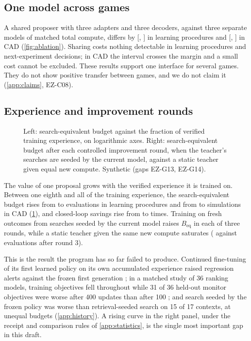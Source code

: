 \subsection{One model across games}

A shared proposer with three adapters and three decoders, against three separate models of matched
total compute, differs by \syn[EZ-G11]{\EZtrA} [\syn[EZ-G11]{\EZtrAlo}, \syn[EZ-G11]{\EZtrAhi}] in
learning procedures and \syn[EZ-G11]{\EZtrC} [\syn[EZ-G11]{\EZtrClo}, \syn[EZ-G11]{\EZtrChi}] in CAD
(\cref{fig:ablation}). Sharing costs nothing detectable in learning procedures and next-experiment
decisions; in CAD the interval crosses the margin and a small cost cannot be excluded. These results
support one interface for several games. They do not show positive transfer between games, and we do
not claim it (\cref{app:claims}, EZ-C08).

\subsection{Experience and improvement rounds}

\begin{figure}[t]
\centering

\caption{Left: search-equivalent budget against the fraction of verified training experience, on
logarithmic axes. Right: search-equivalent budget after each controlled improvement round, when the
teacher's searches are seeded by the current model, against a static teacher given equal new compute.
Synthetic (gaps EZ-G13, EZ-G14).}
\label{fig:scaling}
\end{figure}

The value of one proposal grows with the verified experience it is trained on. Between one eighth
and all of the training experience, the search-equivalent budget rises from
\syn[EZ-G13]{\EZhistAlow} to \syn[EZ-G13]{\EZbeqA} evaluations in learning procedures and from \syn[EZ-G13]{\EZhistClow} to
\syn[EZ-G13]{\EZbeqC} simulations in CAD (\cref{fig:scaling}), and closed-loop savings rise from
\syn[EZ-G13]{\EZhistSaveLow} to \syn[EZ-G13]{\EZsaveB} times. Training on fresh outcomes from searches seeded by
the current model raises $B_{\mathrm{eq}}$ in each of three rounds, while a static teacher given the
same new compute saturates (\syn[EZ-G14]{\EZstaticThree} against \syn[EZ-G14]{\EZbeqA} evaluations after round 3).

This is the result the program has so far failed to produce. Continued fine-tuning of its first
learned policy on its own accumulated experience raised regression alerts against the frozen first
generation \pre{}; in a matched study of 36 ranking models, training objectives fell throughout while
31 of 36 held-out monitor objectives were worse after 400 updates than after 100 \pre{}; and search
seeded by the frozen policy was worse than retrieval-seeded search on 15 of 17 contexts, at unequal
budgets \pre{} (\cref{app:history}). A rising curve in the right panel, under
the receipt and comparison rules of \cref{app:statistics}, is the single most important gap
in this draft.
